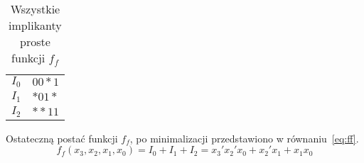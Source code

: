 \begin{table}[H]
    \centering
    \begin{tabular}[t]{ |c|c| }
        \hline
        $I_0$ & $00{*}1$ \\
        $I_1$ & ${*}01{*}$ \\
        $I_2$ & ${*}{*}11$ \\
        \hline
    \end{tabular}
    \caption{Wszystkie implikanty proste funkcji $f_f$} \label{tab:all-implicantsf}
\end{table}

Ostateczną postać funkcji $f_f$, po minimalizacji przedstawiono w równaniu~\ref{eq:ff}.
\begin{equation}
    \label{eq:ff}
    f_f(x_3, x_2, x_1, x_0) = I_0 + I_1 + I_2 = x_3'x_2'x_0 + x_2'x_1 + x_{1}x_0
\end{equation}
